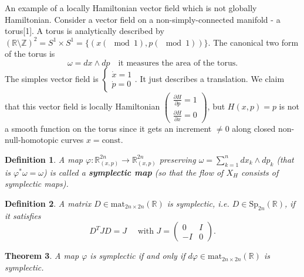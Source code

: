 \documentclass[a4paper, 11pt]{article}
\newtheorem{theorem}{Theorem}
\newtheorem{definition}[theorem]{Definition}
\begin{document}
An example of a locally Hamiltonian vector field which is not globally Hamiltonian. Consider a vector field on a non-simply-connected manifold - a torus[1]. A torus is analytically described by $(\mathbb R \setminus \mathbb Z)^2 = S^1 \times S^1 = \{ (x(\mod 1), p(\mod 1))  \}$. The canonical two form of the torus is 
\[
	\omega = dx \wedge dp \quad \text{it measures the area of the torus.}
\]
The simples vector field is $\begin{cases}
\dot x =1 \\ \dot p = 0
\end{cases}$. It just describes a translation. We claim that this vector field is locally Hamiltonian $\begin{pmatrix}
 	\frac{\partial H}{\partial p} = 1 \\ \frac{\partial H}{\partial x} = 0
\end{pmatrix}$, but $H(x,p) = p$ is not a smooth function on the torus since it gets an increment $\neq 0$ along closed non-null-homotopic curves $x = \mathrm{const}$.

\begin{definition}
	A map $\varphi: \mathbb R^{2n}_{(x,p)} \to \mathbb R^{2n}_{(x,p)}$ preserving $\omega = \sum^n_{k=1} dx_k \wedge dp_k$ (that is $\varphi^* \omega = \omega$) is called a \textbf{symplectic map} (so that the flow of $X_H$ consists of symplectic maps).
\end{definition}

\begin{definition}
	A matrix $D \in \mathrm{mat}_{2n \times 2n} (\mathbb R)$ is symplectic, i.e. $D \in \mathrm{Sp}_{2n}(\mathbb R)$, if it satisfies 
	\[
		D^TJD = J \quad \text{ with $J = \begin{pmatrix}
			0 & I \\ -I & 0
			\end{pmatrix}$}.
	\]
	
\end{definition}

\begin{theorem}
	A map $\varphi$ is symplectic if and only if $d \varphi \in \mathrm{mat}_{2n \times 2n}(\mathbb R)$ is symplectic.
\end{theorem}
\end{document}
